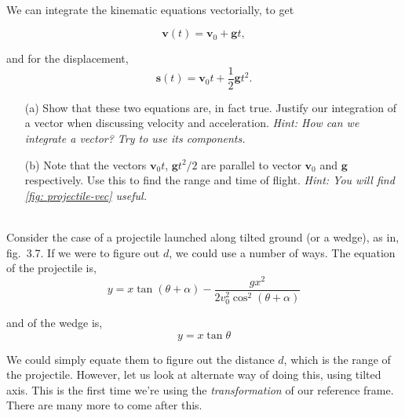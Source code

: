     \begin{exc}
            \begin{exercise}[subtitle={Projectile with Vectors.}, points = 3]
            \\
            We can integrate the kinematic equations vectorially, to get

            \[
            \mathbf{v}(t) = \mathbf{v}_0 + \mathbf{g}t,
            \]
            
            and for the displacement,
            \[
            \mathbf{s}(t) = \mathbf{v}_0 t + \frac{1}{2} \mathbf{g} t^2.
            \]
            
            \begin{enumerate}
                \item[(a)] Show that these two equations are, in fact true. Justify our integration of a vector when 
                discussing velocity and acceleration. \emph{Hint: How can we integrate a vector? Try to use its components.}
            
                \item[(b)] Note that the vectors $\mathbf{v}_0 t$, $\mathbf{g} t^2 / 2$ are parallel to vector $\mathbf{v}_0$ and $\mathbf{g}$ respectively. 
                Use this to find the range and time of flight. \textit{Hint: You will find \cref{fig: projectile-vec} useful.}
            \end{enumerate}
        \end{exercise}

        \begin{exercise}[subtitle={Projectile Motion in tilted axes.}, points = 3, ID=projectile-tilted]
            \\
            Consider the case of a projectile launched along tilted ground (or a wedge), as in, fig.~3.7. 
            If we were to figure out $d$, we could use a number of ways. The equation of the projectile is,
            \[
            y = x \tan(\theta + \alpha) - \frac{g x^2}{2 v_0^2 \cos^2(\theta + \alpha)}
            \]

            and of the wedge is,
            \[
            y = x \tan \theta
            \]

            We could simply equate them to figure out the distance $d$, which is the range of the projectile. 
            However, let us look at alternate way of doing this, using tilted axis. This is the first time 
            we're using the \emph{transformation} of our reference frame. There are many more to come after this.


\end{exercise}
\end{exc}
